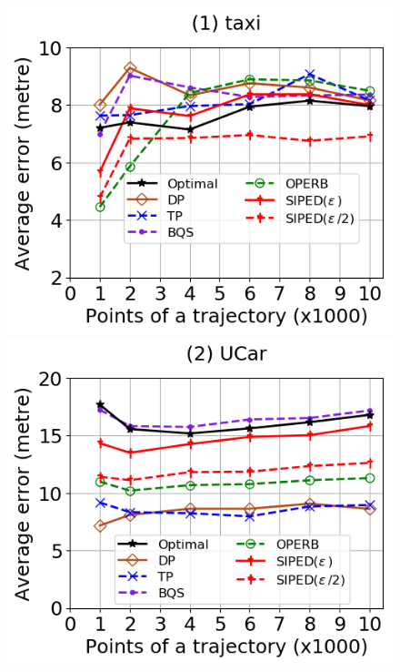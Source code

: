 \begin{figure}[tb!]
	\centering
	\includegraphics[scale=0.315]{Figures/Exp-PED-error-size-taxi.png}\hspace{1ex}
	\includegraphics[scale=0.315]{Figures/Exp-PED-error-size-service.png} 	\hspace{1ex}

\end{figure}
